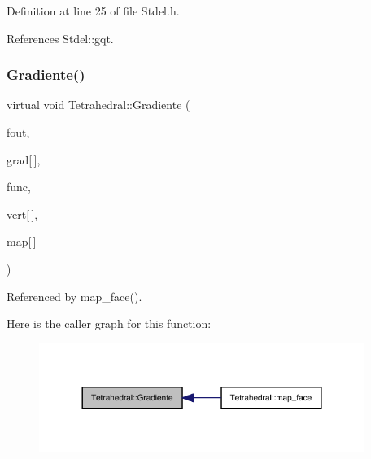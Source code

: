 Definition at line 25 of file Stdel.\+h.



References Stdel\+::gqt.

\mbox{\label{classTetrahedral_a63a3914c89069f2d6c16b1e0aaf3abce}} 
\subsubsection{\texorpdfstring{Gradiente()}{Gradiente()}\hspace{0.1cm}{\footnotesize\ttfamily [1/6]}}
{\footnotesize\ttfamily virtual void Tetrahedral\+::\+Gradiente (\begin{DoxyParamCaption}\item[{F\+I\+LE $\ast$}]{fout,  }\item[{double $\ast$}]{grad\mbox{[}$\,$\mbox{]},  }\item[{double($\ast$)(double, double, double)}]{func,  }\item[{const \hyperlink{structVertice}{Vertice}}]{vert\mbox{[}$\,$\mbox{]},  }\item[{const int}]{map\mbox{[}$\,$\mbox{]} }\end{DoxyParamCaption})\hspace{0.3cm}{\ttfamily [virtual]}}



Referenced by map\+\_\+face().

Here is the caller graph for this function\+:
\nopagebreak
\begin{figure}[H]
\begin{center}
\leavevmode
\includegraphics[width=300pt]{classTetrahedral_a63a3914c89069f2d6c16b1e0aaf3abce_icgraph}
\end{center}
\end{figure}
\mbox{\label{classTetrahedral_a2037c94dd0a270ae6b535a309cccb0e5}} 
